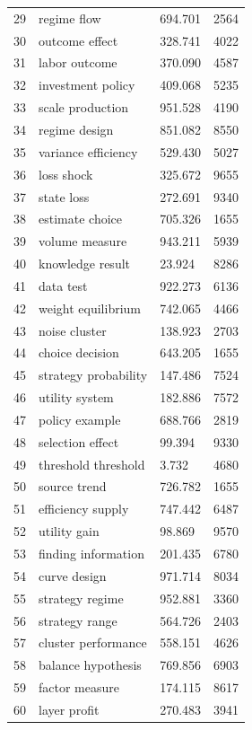\documentclass[11pt]{report}
\begin{document}
\begin{longtable}{rllr}
29 & regime flow & 694.701 & 2564 \\
30 & outcome effect & 328.741 & 4022 \\
31 & labor outcome & 370.090 & 4587 \\
32 & investment policy & 409.068 & 5235 \\
33 & scale production & 951.528 & 4190 \\
34 & regime design & 851.082 & 8550 \\
35 & variance efficiency & 529.430 & 5027 \\
36 & loss shock & 325.672 & 9655 \\
37 & state loss & 272.691 & 9340 \\
38 & estimate choice & 705.326 & 1655 \\
39 & volume measure & 943.211 & 5939 \\
40 & knowledge result & 23.924 & 8286 \\
41 & data test & 922.273 & 6136 \\
42 & weight equilibrium & 742.065 & 4466 \\
43 & noise cluster & 138.923 & 2703 \\
44 & choice decision & 643.205 & 1655 \\
45 & strategy probability & 147.486 & 7524 \\
46 & utility system & 182.886 & 7572 \\
47 & policy example & 688.766 & 2819 \\
48 & selection effect & 99.394 & 9330 \\
49 & threshold threshold & 3.732 & 4680 \\
50 & source trend & 726.782 & 1655 \\
51 & efficiency supply & 747.442 & 6487 \\
52 & utility gain & 98.869 & 9570 \\
53 & finding information & 201.435 & 6780 \\
54 & curve design & 971.714 & 8034 \\
55 & strategy regime & 952.881 & 3360 \\
56 & strategy range & 564.726 & 2403 \\
57 & cluster performance & 558.151 & 4626 \\
58 & balance hypothesis & 769.856 & 6903 \\
59 & factor measure & 174.115 & 8617 \\
60 & layer profit & 270.483 & 3941 \\
\end{longtable}
\end{document}
